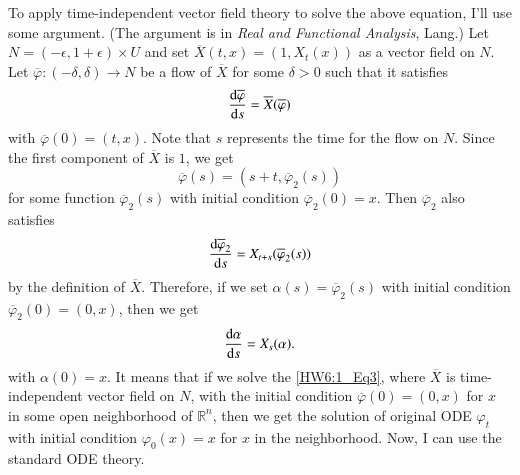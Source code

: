 \documentclass[a4paper, 12pt]{article}
\theoremstyle{Mydefinition}
\theoremstyle{Mytheorem}
\begin{document}
To apply time-independent vector field theory to solve the above equation, I'll use some argument. (The argument is in \textit{Real and Functional Analysis}, Lang.) Let $N = (-\epsilon, 1+\epsilon)\times U$ and set $\overline{X}(t,x) = (1, X_t(x))$ as a vector field on $N$. Let $\overline{\varphi}:(-\delta, \delta)\rightarrow N$ be a flow of $\overline{X}$ for some $\delta>0$ such that it satisfies
\begin{equation}\label{HW6:1_Eq3}
    \dv{\overline{\varphi}}{s} = \overline{X}(\overline{\varphi})
\end{equation}
with $\overline{\varphi}(0) = (t,x)$. Note that $s$ represents the time for the flow on $N$. Since the first component of $\overline{X}$ is $1$, we get
\begin{equation*}
    \overline{\varphi}(s) = (s+t, \overline{\varphi}_2(s))
\end{equation*}
for some function $\overline{\varphi}_2(s)$ with initial condition $\overline{\varphi}_2(0) = x$. Then $\overline{\varphi}_2$ also satisfies
\begin{equation*}
    \dv{\overline{\varphi}_2}{s} = X_{t+s}(\overline{\varphi}_2(s))
\end{equation*}
by the definition of $\overline{X}$. Therefore, if we set $\alpha(s) = \overline{\varphi}_2(s)$ with initial condition $\overline{\varphi}_2(0) = (0,x)$, then we get
\begin{equation*}
    \dv{\alpha}{s} = X_{s}(\alpha).
\end{equation*}
with $\alpha(0) = x$. It means that if we solve the \eqref{HW6:1_Eq3}, where $\overline{X}$ is time-independent vector field on $N$, with the initial condition $\overline{\varphi}(0) = (0,x)$ for $x$ in some open neighborhood of $\mathbb{R}^n$, then we get the solution of original ODE $\varphi_t$ with initial condition $\varphi_0(x) = x$ for $x$ in the neighborhood. Now, I can use the standard ODE theory.
\end{document}

